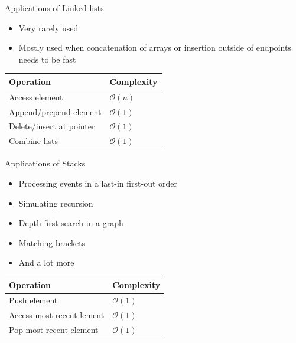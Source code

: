 \documentclass{beamer}
\begin{document}
\begin{frame}[plain]{Applications of Linked lists}
    \begin{itemize}
        \item Very rarely used
        \item Mostly used when concatenation of arrays or insertion outside of endpoints needs to be fast
    \end{itemize}
    \vspace*{1cm}
    \begin{center}
    \begin{tabular}{l|l}
    Operation & Complexity \\ \hline
    Access element & $\mathcal{O}(n)$ \\
    Append/prepend element & $\mathcal{O}(1)$ \\
    Delete/insert at pointer & $\mathcal{O}(1)$ \\
    Combine lists & $\mathcal{O}(1)$ \\
    \end{tabular}
    \end{center}
\end{frame}

\begin{frame}[plain]{Applications of Stacks}
    \begin{itemize}
        \item Processing events in a last-in first-out order
        \item Simulating recursion
        \item Depth-first search in a graph
        \item Matching brackets
        \item And a lot more
    \end{itemize}
    \vspace*{1cm}
    \begin{center}
    \begin{tabular}{l|l}
    Operation & Complexity \\ \hline
    Push element & $\mathcal{O}(1)$ \\
    Access most recent lement & $\mathcal{O}(1)$ \\
    Pop most recent element & $\mathcal{O}(1)$ \\
    \end{tabular}
    \end{center}
\end{frame}
\end{document}

